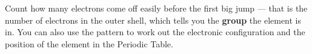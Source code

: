 \documentclass[11pt]{article}
\begin{document}
Count how many electrons come off easily before the first big jump — that is the number of electrons in the outer shell, which tells you the \textbf{group} the element is in. You can also use the pattern to work out the electronic configuration and the position of the element in the Periodic Table.

\begin{center}
\end{center}
\end{document}

